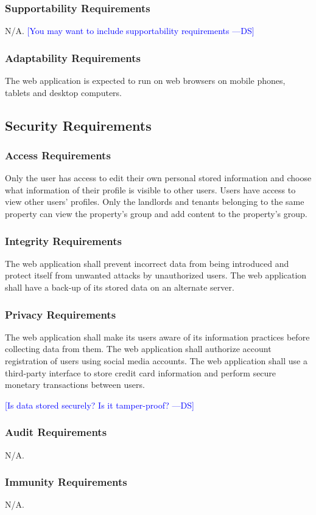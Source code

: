 \documentclass[12pt]{article}
\newcommand{\authornote}[3]{\textcolor{#1}{[#3 ---#2]}}
\newcommand{\authornote}[3]{}
\newcommand{\ds}[1]{\authornote{blue}{DS}{#1}}
\begin{document}
{\subsubsection{Supportability Requirements}
N/A. 
\ds{You may want to include supportability requirements}

\subsubsection{Adaptability Requirements}
The web application is expected to run on web browsers on mobile phones, tablets 
and desktop computers.
\subsection{Security Requirements}
\subsubsection{Access Requirements}
Only the user has access to edit their own personal stored information and 
choose what information of their profile is visible to other users. Users have 
access to view other users' profiles. Only the landlords and tenants belonging 
to the same property can view the property's group and add content to the 
property's group.
\subsubsection{Integrity Requirements}
The web application shall prevent incorrect data from being introduced and 
protect itself from unwanted attacks by unauthorized users. The web application 
shall have a back-up of its stored data on an alternate server.
\subsubsection{Privacy Requirements}
The web application shall make its users aware of its information practices 
before collecting data from them. The web application shall authorize account 
registration of users using social media accounts. The web application shall use 
a third-party interface to store credit card information and perform secure 
monetary transactions between users.

\ds{Is data stored securely? Is it tamper-proof?}
\subsubsection{Audit Requirements}
N/A.
\subsubsection{Immunity Requirements}
N/A.
}
\end{document}
